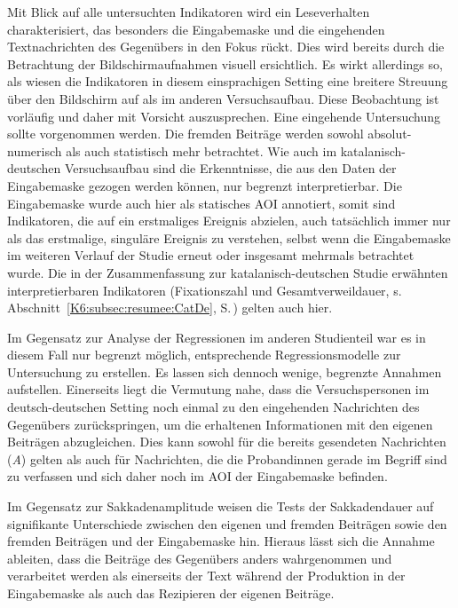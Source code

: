 Mit Blick auf alle untersuchten Indikatoren wird ein Leseverhalten charakterisiert, das besonders die Eingabemaske und die eingehenden Textnachrichten des Gegenübers in den Fokus rückt. Dies wird bereits durch die Betrachtung der Bildschirmaufnahmen visuell ersichtlich. Es wirkt allerdings so, als wiesen die Indikatoren in diesem einsprachigen Setting eine breitere Streuung über den Bildschirm auf als im anderen Versuchsaufbau. Diese Beobachtung ist vorläufig und daher mit Vorsicht auszusprechen. Eine eingehende Untersuchung sollte vorgenommen werden. Die fremden Beiträge werden sowohl absolut-numerisch als auch statistisch mehr betrachtet. Wie auch im katalanisch-deutschen Versuchsaufbau sind die Erkenntnisse, die aus den Daten der Eingabemaske gezogen werden können, nur begrenzt interpretierbar. Die Eingabemaske wurde auch hier als statisches AOI annotiert, somit sind Indikatoren, die auf ein erstmaliges Ereignis abzielen, auch tatsächlich immer nur als das erstmalige, singuläre Ereignis zu verstehen, selbst wenn die Eingabemaske im weiteren Verlauf der Studie erneut oder insgesamt mehrmals betrachtet wurde. Die in der Zusammenfassung zur katalanisch-deutschen Studie erwähnten interpretierbaren Indikatoren (Fixationszahl und Gesamtverweildauer, s. Abschnitt \,\ref{K6:subsec:resumee:CatDe}, S.\,\pageref{K6:subsec:resumee:CatDe}) gelten auch hier.

Im Gegensatz zur Analyse der Regressionen im anderen Studienteil war es in diesem Fall nur begrenzt möglich, entsprechende Regressionsmodelle zur Untersuchung zu erstellen. Es lassen sich dennoch wenige, begrenzte Annahmen aufstellen. Einerseits liegt die Vermutung nahe, dass die Versuchspersonen im deutsch-deutschen Setting noch einmal zu den eingehenden Nachrichten des Gegenübers zurückspringen, um die erhaltenen Informationen mit den eigenen Beiträgen abzugleichen. Dies kann sowohl für die bereits gesendeten Nachrichten (\emph{A}) gelten als auch für Nachrichten, die die Proband{\textperiodcentered}innen gerade im Begriff sind zu verfassen und sich daher noch im AOI der Eingabemaske befinden.

Im Gegensatz zur Sakkadenamplitude weisen die Tests der Sakkadendauer auf signifikante Unterschiede zwischen den eigenen und fremden Beiträgen sowie den fremden Beiträgen und der Eingabemaske hin. Hieraus lässt sich die Annahme ableiten, dass die Beiträge des Gegenübers anders wahrgenommen und verarbeitet werden als einerseits der Text während der Produktion in der Eingabemaske als auch das Rezipieren der eigenen Beiträge.
